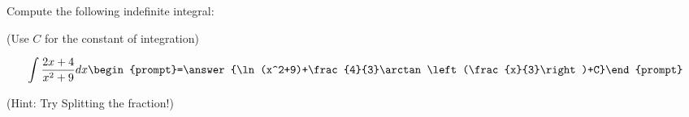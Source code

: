 \documentclass{ximera}
\author{Jim Talamo}
\begin{document}
\begin{exercise}
Compute the following indefinite integral:

\begin{prompt} (Use $C$ for the constant of integration) \end{prompt}

\[
\int \frac{2x+4}{x^2+9} dx 
\begin{prompt}=\answer{\ln(x^2+9)+\frac{4}{3}\arctan\left(\frac{x}{3}\right)+C}\end{prompt}
\]

(Hint: Try Splitting the fraction!)

\end{exercise}
\end{document}
